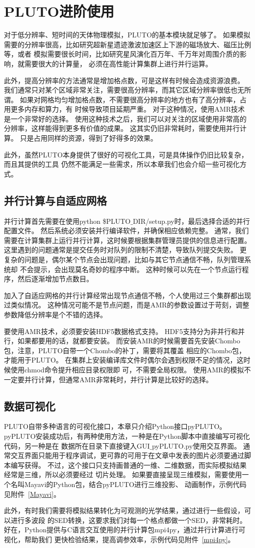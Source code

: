 \section{PLUTO进阶使用}
\label{PLUTOmore}
对于低分辨率、短时间的天体物理模拟，PLUTO的基本模块就足够了。
如果模拟需要的分辨率很高，比如研究超新星遗迹激波加速区上下游的磁场放大、磁压比例等，或者
模拟需要很长时间，比如研究星风演化百万年、千万年对周围介质的影响，就需要很大的计算量，
必须在高性能计算集群上进行并行运算。

此外，提高分辨率的方法通常是增加格点数，可是这样有时候会造成资源浪费。
我们通常只对某个区域非常关注，需要很高分辨率，而其它区域分辨率很低也无所谓。
如果对网格均匀增加格点数，不需要很高分辨率的地方也有了高分辨率，占用更多内存和算力，有
时候导致项目延期严重。
对于这种情况，使用AMR技术是一个非常好的选择。
使用这种技术之后，我们可以对关注的区域使用非常高的分辨率，这样能得到更多有价值的成果。
这其实仍旧非常耗时，需要使用并行计算。
只是占用同样的资源，得到了好得多的效果。

此外，虽然PLUTO本身提供了很好的可视化工具，可是具体操作仍旧比较复杂，而且其提供的工具
仍然不能满足一些需求，所以本章我们也会介绍一些可视化方式。

\subsection{并行计算与自适应网格}
并行计算首先需要在使用python \$PLUTO$\_$DIR/setup.py时，最后选择合适的并行配置文件。
然后系统必须安装并行编译软件，并确保相应依赖完整。
通常，我们需要在计算集群上运行并行计算，这时候要根据集群管理员提供的信息进行配置。
这里遇到的问题通常是提交任务时对队列的限制不清楚，导致队列提交失败。
更复杂的问题是，偶尔某个节点会出现问题，比如与其它节点通信不畅，队列管理系统却
不会提示，会出现莫名奇妙的程序中断。
这种时候可以先在一个节点运行程序，然后逐渐增加节点数目。

加入了自适应网格的并行计算经常出现节点通信不畅，个人使用过三个集群都出现过类似情况。
这种情况可能不是节点问题，而是AMR的参数设置过于苛刻，调整参数降低分辨率是个不错的选择。

要使用AMR技术，必须要安装HDF5数据格式支持。
HDF5支持分为非并行和并行，如果都要用的话，就都要安装。
而安装AMR的时候需要首先安装Chombo包，注意，PLUTO自带一个Chombo的补丁，需要将其覆盖
相应的Chombo包，才能用于PLUTO。
在集群上安装编译库文件时偶尔会遇到权限不足的情况，这时候使用chmod命令提升相应目录权限即
可，不需要全局权限。
使用AMR的模拟不一定要并行计算，但通常AMR非常耗时，并行计算是比较好的选择。

\subsection{数据可视化}
PLUTO自带多种语言的可视化接口，本章只介绍Python接口pyPLUTO。
pyPLUTO安装成功后，有两种使用方法，一种是在Python脚本中直接编写可视化代码，另一种是在
数据所在目录下直接键入GUI$\_$pyPLUTO.py使用交互界面。
通常交互界面只能用于程序调试，更可靠的可用于在文章中发表的图片必须要通过脚本编写获得。
不过，这个接口只支持画普通的一维、二维数据，而实际模拟结果经常是三维，所以必须要经过
切片处理。
如果要直接呈现三维模拟，需要使用一个名叫Mayavi的Python包，结合pyPLUTO进行三维投影、
动画制作，示例代码见附件~\ref{Mayavi}。

此外，有时我们需要将模拟结果转化为可观测的光学结果，通过进行一些假设，可以进行多波段
的SED转换，这要求我们对每一个格点都做一个SED，非常耗时。
好在，Python提供与C语言交互使用的并行计算包mpi4py，通过并行计算进行可视化，帮助我们
更快检验结果，提高调参效率，示例代码见附件~\ref{mpi4py}。
